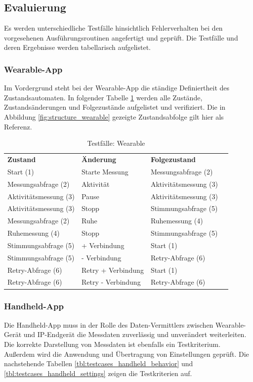 \subsection{Evaluierung}
Es werden unterschiedliche Testfälle hinsichtlich Fehlerverhalten bei den vorgesehenen Ausführungsroutinen angefertigt und geprüft. Die Testfälle und deren Ergebnisse werden tabellarisch aufgelistet.
\subsubsection{Wearable-App}
Im Vordergrund steht bei der Wearable-App die ständige Definiertheit des Zustandsautomaten. In folgender Tabelle \ref{tbl:testcases_wearable} werden alle Zustände, Zustandsänderungen und Folgezustände aufgelistet und verifiziert. Die in Abbildung \ref{fig:structure_wearable} gezeigte Zustandsabfolge gilt hier als Referenz.

\begin{table}[h]
	\centering
		\begin{tabularx}{\textwidth}{lXlc}
			\textbf{Zustand} 			& \textbf{Änderung} 	& \textbf{Folgezustand} 	&  \\
			Start (1) 						& Starte Messung 			& Messungsabfrage (2) 		& \ok \\
			Messungsabfrage (2) 	& Aktivität 					& Aktivitätsmessung (3) 	& \ok \\
			Aktivitätsmessung (3) & Pause 							& Aktivitätsmessung (3) 	& \ok \\
			Aktivitätsmessung (3) & Stopp 							& Stimmungsabfrage (5) 		& \ok \\
			Messungsabfrage (2) 	& Ruhe 								& Ruhemessung (4) 				& \ok \\
			Ruhemessung (4) 			& Stopp 							& Stimmungsabfrage (5) 		& \ok \\
			Stimmungsabfrage (5) 	& + Verbindung 				& Start (1) 							& \ok \\
			Stimmungsabfrage (5) 	& - Verbindung 				& Retry-Abfrage (6) 			& \ok \\
			Retry-Abfrage (6) 		& Retry + Verbindung 	& Start (1) 							& \ok \\
			Retry-Abfrage (6) 		& Retry - Verbindung 	& Retry-Abfrage (6) 			& \ok \\
		\end{tabularx}
		\caption{Testfälle: Wearable}
		\label{tbl:testcases_wearable}
\end{table}

\subsubsection{Handheld-App}
Die Handheld-App muss in der Rolle des Daten-Vermittlers zwischen Wearable-Gerät und IP-Endgerät die Messdaten zuverlässig und unverändert weiterleiten. Die korrekte Darstellung von Messdaten ist ebenfalls ein Testkriterium. Außerdem wird die Anwendung und Übertragung von Einstellungen geprüft. Die nachstehende Tabellen \ref{tbl:testcases_handheld_behavior} und \ref{tbl:testcases_handheld_settings} zeigen die Testkriterien auf.

